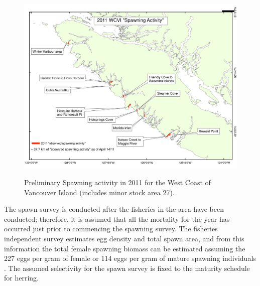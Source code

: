 \begin{figure}[!tbp]
	\ContinuedFloat
	\centering
	\includegraphics[scale=0.5]{../Figs/PBSfigs/2011-WCVI-Prelim-WG.pdf}\\
	\caption{Preliminary Spawning activity in 2011 for the West Coast of Vancouver Island (includes minor stock area 27).}\label{figSpawnMaps}
\end{figure}

	The spawn survey is conducted after the fisheries in the area have been conducted; therefore, it is assumed that all the mortality for the year has occurred just prior to commencing the spawning survey. The fisheries independent survey estimates egg density and total spawn area, and from this information the total female spawning biomass can be estimated assuming the 227 eggs per gram of female  or 114 eggs per gram of mature spawning individuals \citep{hardwick1973biomass}. The assumed selectivity for the spawn survey is fixed to the maturity schedule for herring.  	
	
